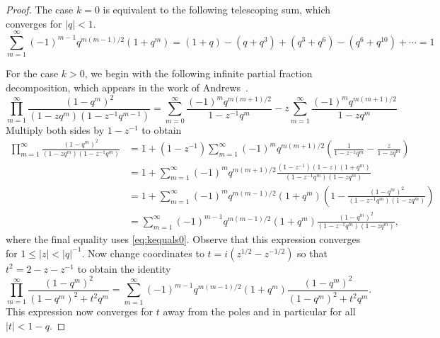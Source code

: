 \documentclass[a4paper]{article}
\theoremstyle{plain}
\theoremstyle{definition}
\renewcommand{\leq}{\leqslant}
\begin{document}
\begin{proof}
The case $k=0$ is equivalent to the following telescoping sum, which converges for $|q| < 1$.
\begin{equation} \label{eq:kequals0}
\sum_{m=1}^\infty(-1)^{m-1}q^{m(m-1)/2}(1+q^m) = (1+q) - (q+q^3) + (q^3+q^6) - (q^6 + q^{10}) + \cdots = 1
\end{equation}


For the case $k > 0$, we begin with the following infinite partial fraction decomposition, which appears in the work of Andrews~\cite[Equation~(2.1)]{AndHec}.
\[
\prod_{m=1}^\infty\frac{(1-q^m)^2}{(1-zq^m) (1-z^{-1}q^{m-1})}=\sum_{m=0}^\infty\frac{(-1)^mq^{m(m+1)/2}}{1-z^{-1}q^m}-z\sum_{m=1}^\infty\frac{(-1)^mq^{m(m+1)/2}}{1-zq^m}
\]
Multiply both sides by $1-z^{-1}$ to obtain
\begin{align*}
\prod_{m=1}^\infty\frac{(1-q^m)^2}{(1-zq^m)(1-z^{-1}q^m)}&=1+(1-z^{-1})\sum_{m=1}^\infty(-1)^mq^{m(m+1)/2} \left( \frac{1}{1-z^{-1}q^m}-\frac{z}{1-zq^m} \right) \\
&=1+\sum_{m=1}^\infty(-1)^mq^{m(m+1)/2}\frac{(1-z^{-1})(1-z)(1+q^m)}{(1-z^{-1}q^m)(1-zq^m)}\\
&=1+\sum_{m=1}^\infty(-1)^mq^{m(m-1)/2}(1+q^m)\left(1-\frac{(1-q^m)^2}{(1-z^{-1}q^m)(1-zq^m)}\right)\\
&=\sum_{m=1}^\infty(-1)^{m-1}q^{m(m-1)/2}(1+q^m)\frac{(1-q^m)^2}{(1-z^{-1}q^m)(1-zq^m)},
\end{align*}
where the final equality uses \cref{eq:kequals0}. Observe that this expression converges for $1 \leq |z| < |q|^{-1}$. Now change coordinates to $t = i(z^{1/2}-z^{-1/2})$ so that $t^2=2-z-z^{-1}$ to obtain the identity
\begin{equation} \label{qid}
\prod_{m=1}^\infty\frac{(1-q^m)^2}{(1-q^m)^2+t^2q^m} = \sum_{m=1}^\infty(-1)^{m-1}q^{m(m-1)/2}(1+q^m)\frac{(1-q^m)^2}{(1-q^m)^2+t^2q^m}.
\end{equation}
This expression now converges for $t$ away from the poles and in particular for all $|t| < 1-q$.



\end{proof}
\end{document}
